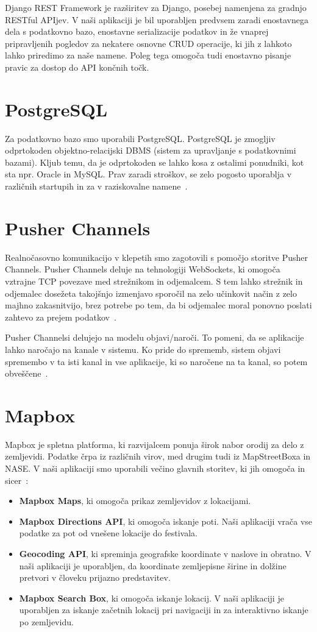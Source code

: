 \documentclass[a4paper,12pt,openright]{book}
\begin{document}
Django REST Framework je razširitev za Django, posebej namenjena za gradnjo RESTful APIjev.
V naši aplikaciji je bil uporabljen predvsem zaradi enostavnega dela s podatkovno bazo, enostavne serializacije podatkov in že vnaprej pripravljenih pogledov za nekatere osnovne CRUD operacije, ki jih z lahkoto lahko priredimo za naše namene.
Poleg tega omogoča tudi enostavno pisanje pravic za dostop do API končnih točk.

\section{PostgreSQL}
Za podatkovno bazo smo uporabili PostgreSQL.
PostgreSQL je zmogljiv odprtokoden objektno-relacijski DBMS (sistem za upravljanje s podatkovnimi bazami).
Kljub temu, da je odprtokoden se lahko kosa z ostalimi ponudniki, kot sta npr. Oracle in MySQL.
Prav zaradi stroškov, se zelo pogosto uporablja v različnih startupih in za v raziskovalne namene~\cite{juba2015learning}.

\section{Pusher Channels}
Realnočasovno komunikacijo v klepetih smo zagotovili s pomočjo storitve Pusher Channels.
Pusher Channels deluje na tehnologiji WebSockets, ki omogoča vztrajne TCP povezave med strežnikom in odjemalcem.
S tem lahko strežnik in odjemalec dosežeta takojšnjo izmenjavo sporočil na zelo učinkovit način z zelo majhno zakasnitvijo, brez potrebe po tem, da bi odjemalec moral ponovno poslati zahtevo za prejem podatkov~\cite{websockets}.

Pusher Channelsi delujejo na modelu objavi/naroči.
To pomeni, da se aplikacije lahko naročajo na kanale v sistemu.
Ko pride do sprememb, sistem objavi spremembo v ta isti kanal in vse aplikacije, ki so naročene na ta kanal, so potem obveščene~\cite{pusher}.

\section{Mapbox}
Mapbox je spletna platforma, ki razvijalcem ponuja širok nabor orodij za delo z zemljevidi.
Podatke črpa iz različnih virov, med drugim tudi iz MapStreetBoxa in NASE. 
V naši aplikaciji smo uporabili večino glavnih storitev, ki jih omogoča in sicer~\cite{mapboxservices}:
\begin{itemize}
    \item \textbf{Mapbox Maps}, ki omogoča prikaz zemljevidov z lokacijami.
    \item \textbf{Mapbox Directions API}, ki omogoča iskanje poti. Naši aplikaciji vrača vse podatke za pot od vnešene lokacije do festivala.
    \item \textbf{Geocoding API}, ki spreminja geografske koordinate v naslove in obratno. V naši aplikaciji je uporabljen, da koordinate zemljepisne širine in dolžine pretvori v človeku prijazno predstavitev.
    \item \textbf{Mapbox Search Box}, ki omogoča iskanje lokacij. V naši aplikaciji je uporabljen za iskanje začetnih lokacij pri navigaciji in za interaktivno iskanje po zemljevidu.
\end{itemize}
\end{document}
